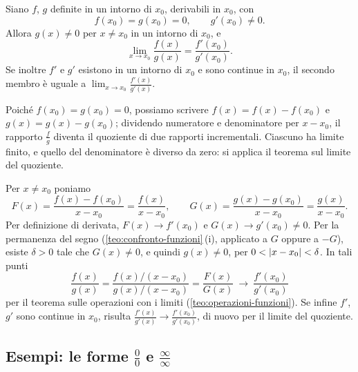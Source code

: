\begin{proposizione}\label{prop:hopital-semplice}
Siano $f$, $g$ definite in un intorno di $x_{0}$, derivabili in $x_{0}$, con
\[
  f(x_{0})=g(x_{0})=0, \qquad g'(x_{0})\neq0 .
\]
Allora $g(x)\neq0$ per $x\neq x_{0}$ in un intorno di $x_{0}$, e
\begin{equation}\label{eq:hopital-semplice}
  \lim_{x\to x_{0}}\frac{f(x)}{g(x)}=\frac{f'(x_{0})}{g'(x_{0})} .
\end{equation}
Se inoltre $f'$ e $g'$ esistono in un intorno di $x_{0}$ e sono continue in $x_{0}$, il
secondo membro è uguale a $\lim_{x\to x_{0}}\frac{f'(x)}{g'(x)}$.
\end{proposizione}

\begin{schema}
\end{schema}

\begin{strategia}
Poiché $f(x_{0})=g(x_{0})=0$, possiamo scrivere $f(x)=f(x)-f(x_{0})$ e
$g(x)=g(x)-g(x_{0})$; dividendo numeratore e denominatore per $x-x_{0}$, il rapporto
$\frac{f}{g}$ diventa il quoziente di due rapporti incrementali. Ciascuno ha limite
finito, e quello del denominatore è diverso da zero: si applica il teorema sul limite
del quoziente.
\end{strategia}

\begin{dimostrazione}
Per $x\neq x_{0}$ poniamo
\[
  F(x)=\frac{f(x)-f(x_{0})}{x-x_{0}}=\frac{f(x)}{x-x_{0}}, \qquad
  G(x)=\frac{g(x)-g(x_{0})}{x-x_{0}}=\frac{g(x)}{x-x_{0}} .
\]
Per definizione di derivata, $F(x)\to f'(x_{0})$ e $G(x)\to g'(x_{0})\neq0$. Per la
permanenza del segno (\cref{teo:confronto-funzioni}\,(i), applicato a $G$ oppure a $-G$),
esiste $\delta>0$ tale che $G(x)\neq0$, e quindi $g(x)\neq0$, per
$0<\lvert x-x_{0}\rvert<\delta$. In tali punti
\[
  \frac{f(x)}{g(x)}=\frac{f(x)/(x-x_{0})}{g(x)/(x-x_{0})}=\frac{F(x)}{G(x)}
  \ \longrightarrow\ \frac{f'(x_{0})}{g'(x_{0})}
\]
per il teorema sulle operazioni con i limiti (\cref{teo:operazioni-funzioni}). Se infine
$f'$, $g'$ sono continue in $x_{0}$, risulta $\frac{f'(x)}{g'(x)}\to\frac{f'(x_{0})}{g'(x_{0})}$,
di nuovo per il limite del quoziente.
\end{dimostrazione}

\subsection{Esempi: le forme \texorpdfstring{$\frac00$}{0/0} e \texorpdfstring{$\frac\infty\infty$}{inf/inf}}


